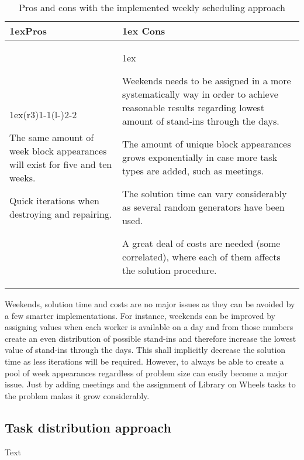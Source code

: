 \begin{table}[!h]
\caption{Pros and cons with the implemented weekly scheduling approach}
\label{pros_cons_weekly_scheduling}
\begin{tabularx}{\linewidth}{>{\parskip1ex}X@{\kern4\tabcolsep}>{\parskip1ex}X}
\toprule
\hfil\bfseries Pros
&
\hfil\bfseries Cons
\\\cmidrule(r{3\tabcolsep}){1-1}\cmidrule(l{-\tabcolsep}){2-2}

The same amount of week block appearances will exist for five and ten weeks.\par
Quick iterations when destroying and repairing.\par

&

Weekends needs to be assigned in a more systematically way in order to achieve reasonable results regarding lowest amount of stand-ins through the days.\par
The amount of unique block appearances grows exponentially in case more task types are added, such as meetings.\par
The solution time can vary considerably as several random generators have been used.\par
A great deal of costs are needed (some correlated), where each of them affects the solution procedure.

\\\bottomrule
\end{tabularx}
\end{table}

 Weekends, solution time and costs are no major issues as they can be avoided by a few smarter implementations. For instance, weekends can be improved by assigning values when each worker is available on a day and from those numbers create an even distribution of possible stand-ins and therefore increase the lowest value of stand-ins through the days. This shall implicitly decrease the solution time as less iterations will be required. However, to always be able to create a pool of week appearances regardless of problem size can easily become a major issue. Just by adding meetings and the assignment of Library on Wheels tasks to the problem makes it grow considerably.
 

\subsection{Task distribution approach}
Text
